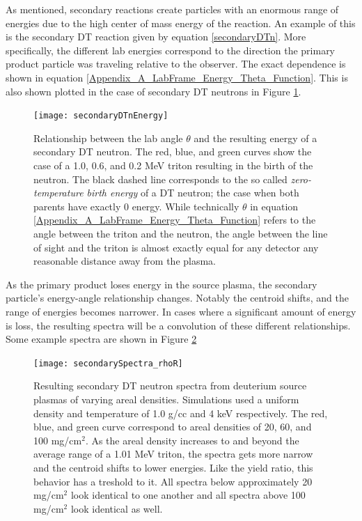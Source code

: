	As mentioned, secondary reactions create particles with an enormous range of energies due to the high center of mass energy of the reaction. An example of this is the secondary DT reaction given by equation \ref{secondaryDTn}. More specifically, the different lab energies correspond to the direction the primary product particle was traveling relative to the observer. The exact dependence is shown in equation \ref{Appendix_A_LabFrame_Energy_Theta_Function}. This is also shown plotted in the case of secondary DT neutrons in Figure \ref{secondaryDTnEnergy}.
	
	
	\begin{figure}[h!]
		\centering
		\texttt{[image: secondaryDTnEnergy]}
		\caption[Secondary DT neutron angle-energy relationship]{Relationship between the lab angle $\theta$ and the resulting energy of a secondary DT neutron. The red, blue, and green curves show the case of a 1.0, 0.6, and 0.2 MeV triton resulting in the birth of the neutron. The black dashed line corresponds to the so called \emph{zero-temperature birth energy} of a DT neutron; the case when both parents have exactly 0 energy. While technically $\theta$ in equation \ref{Appendix_A_LabFrame_Energy_Theta_Function} refers to the angle between the triton and the neutron, the angle between the line of sight and the triton is almost exactly equal for any detector any reasonable distance away from the plasma. }
		\label{secondaryDTnEnergy}
	\end{figure}

	As the primary product loses energy in the source plasma, the secondary particle's energy-angle relationship changes. Notably the centroid shifts, and the range of energies becomes narrower. In cases where a significant amount of energy is loss, the resulting spectra will be a convolution of these different relationships. Some example spectra are shown in Figure \ref{secondarySpectra_rhoR}
	
	\begin{figure}[h!]
		\centering
		\texttt{[image: secondarySpectra\_rhoR]}
		\caption[Secondary DT neutron spectra for varying areal densities]{Resulting secondary DT neutron spectra from deuterium source plasmas of varying areal densities. Simulations used a uniform density and temperature of 1.0 g/cc and 4 keV respectively. The red, blue, and green curve correspond to areal densities of 20, 60, and 100 mg/cm$^2$. As the areal density increases to and beyond the average range of a 1.01 MeV triton, the spectra gets more narrow and the centroid shifts to lower energies. Like the yield ratio, this behavior has a treshold to it. All spectra below approximately 20 mg/cm$^2$ look identical to one another and all spectra above 100 mg/cm$^2$ look identical as well.}
		\label{secondarySpectra_rhoR}
	\end{figure}
		
